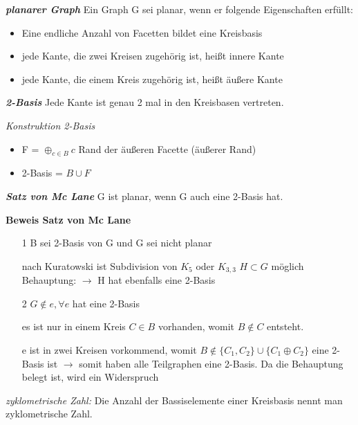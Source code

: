 \textbf{\textit{planarer Graph}} \newline
Ein Graph G sei planar, wenn er folgende Eigenschaften erfüllt: 
\begin{itemize}
	\item Eine endliche Anzahl von Facetten bildet eine Kreisbasis
	\item jede Kante, die zwei Kreisen zugehörig ist, heißt innere Kante
	\item jede Kante, die einem Kreis zugehörig ist, heißt äußere Kante
\end{itemize}
\textbf{\textit{2-Basis}}\newline
Jede Kante ist genau 2 mal in den Kreisbasen vertreten.\newline
 
\textit{Konstruktion 2-Basis}
\begin{itemize}
	\item F = $\oplus_{c \in B}c$ Rand der äußeren Facette (äußerer Rand)
	\item 2-Basis = $B \cup F$ 
\end{itemize}

\newpage
\textbf{\textit{Satz von Mc Lane}}\newline
G ist planar, wenn G auch eine 2-Basis hat.

\textbf{Beweis Satz von Mc Lane}\newline
\begin{itemize}
	\item[1] B sei 2-Basis von G und G sei nicht planar 
	\item[] nach Kuratowski ist Subdivision von $K_5$ oder $K_{3,3}$ $H \subset G$ möglich \newline Behauptung: $\rightarrow$ H hat ebenfalls eine 2-Basis \newline
	
	\item[2] $G \notin e, \forall e$ hat eine 2-Basis
	\item[] es ist nur in einem Kreis $C \in B$ vorhanden, womit $B \notin C$ entsteht.
	\item[] e ist in zwei Kreisen vorkommend, womit $B \notin \{C_1, C_2\} \cup \{ C_1 \oplus C_2\}$ eine 2-Basis ist \newline $\rightarrow$ somit haben alle Teilgraphen eine 2-Basis. Da die Behauptung belegt ist, wird ein Widerspruch 
\end{itemize}
\textit{zyklometrische Zahl:} Die Anzahl der Bassiselemente einer Kreisbasis nennt man zyklometrische Zahl.\newline

